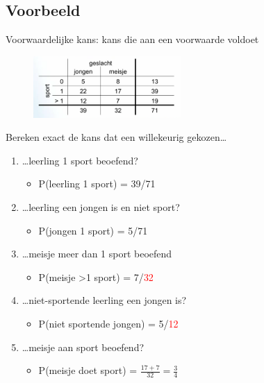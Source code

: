 \documentclass{article}
\begin{document}
\subsection{Voorbeeld}

Voorwaardelijke kans: kans die aan een voorwaarde voldoet

\begin{figure}[H]
    \centering
    \includegraphics[width=0.5\textwidth]{voorwaardelijke-kans-sport.png}
\end{figure}

Bereken exact de kans dat een willekeurig gekozen\dots

\begin{enumerate}
    \item \dots leerling 1 sport beoefend?
    \begin{itemize}
        \item P(leerling 1 sport) = 39/71
    \end{itemize}
    \item \dots leerling een jongen is en niet sport?
    \begin{itemize}
        \item P(jongen 1 sport) = 5/71
    \end{itemize}
    \item \dots meisje meer dan 1 sport beoefend
    \begin{itemize}
        \item P(meisje >1 sport) = 7/\textcolor{red}{32}
    \end{itemize}
    \item \dots niet-sportende leerling een jongen is?
    \begin{itemize}
        \item P(niet sportende jongen) = 5/\textcolor{red}{12}
    \end{itemize}
    \item \dots meisje aan sport beoefend?
    \begin{itemize}
        \item P(meisje doet sport) = $\frac{17 + 7}{32} = \frac34$
    \end{itemize}
\end{enumerate}
\end{document}
